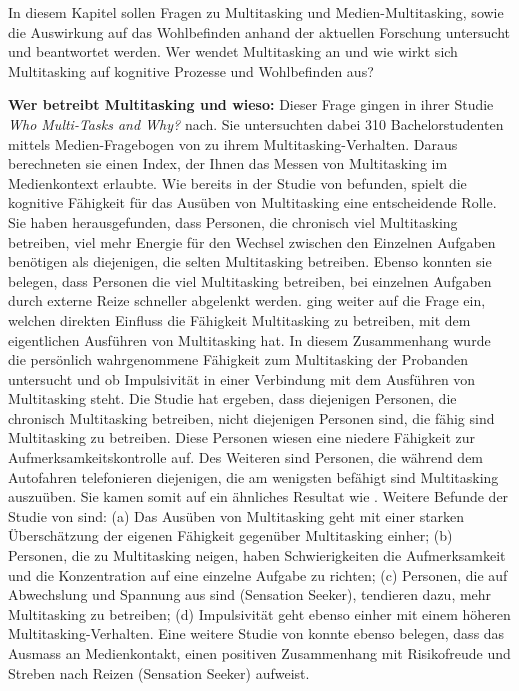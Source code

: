\label{section.bisherigeForschung}
In diesem Kapitel sollen Fragen zu Multitasking und Medien-Multitasking, sowie die Auswirkung auf das Wohlbefinden anhand der aktuellen Forschung untersucht und beantwortet werden. Wer wendet Multitasking an und wie wirkt sich Multitasking auf kognitive Prozesse und Wohlbefinden aus?
\par
\textbf{Wer betreibt Multitasking und wieso:} Dieser Frage gingen  in ihrer Studie \textit{Who Multi-Tasks and Why?} nach. Sie untersuchten dabei 310 Bachelorstudenten mittels Medien-Fragebogen von  zu ihrem Multitasking-Verhalten. Daraus berechneten sie einen Index, der Ihnen das Messen von Multitasking im Medienkontext erlaubte. Wie bereits in der Studie von  befunden, spielt die kognitive Fähigkeit für das Ausüben von Multitasking eine entscheidende Rolle. Sie haben herausgefunden, dass Personen, die chronisch viel Multitasking betreiben, viel mehr Energie für den Wechsel zwischen den Einzelnen Aufgaben benötigen als diejenigen, die selten Multitasking betreiben. Ebenso konnten sie belegen, dass Personen die viel Multitasking betreiben, bei einzelnen Aufgaben durch externe Reize schneller abgelenkt werden.  ging weiter auf die Frage ein, welchen direkten Einfluss die Fähigkeit Multitasking zu betreiben, mit dem eigentlichen Ausführen von Multitasking hat. In diesem Zusammenhang wurde die persönlich wahrgenommene Fähigkeit zum Multitasking der Probanden untersucht und ob Impulsivität in einer Verbindung mit dem Ausführen von Multitasking steht. Die Studie hat ergeben, dass diejenigen Personen, die chronisch Multitasking betreiben, nicht diejenigen Personen sind, die fähig sind Multitasking zu betreiben. Diese Personen wiesen eine niedere Fähigkeit zur Aufmerksamkeitskontrolle auf. Des Weiteren sind Personen, die während dem Autofahren telefonieren diejenigen, die am wenigsten befähigt sind Multitasking auszuüben. Sie kamen somit auf ein ähnliches Resultat wie . Weitere Befunde der Studie von  sind: (a) Das Ausüben von Multitasking geht mit einer starken Überschätzung der eigenen Fähigkeit gegenüber Multitasking einher; (b) Personen, die zu Multitasking neigen, haben Schwierigkeiten die Aufmerksamkeit und die Konzentration auf eine einzelne Aufgabe zu richten; (c) Personen, die auf Abwechslung und Spannung aus sind (Sensation Seeker), tendieren dazu, mehr Multitasking zu betreiben; (d) Impulsivität geht ebenso einher mit einem höheren Multitasking-Verhalten. Eine weitere Studie von  konnte ebenso belegen, dass das Ausmass an Medienkontakt, einen positiven Zusammenhang mit Risikofreude und Streben nach Reizen (Sensation Seeker) aufweist. 
